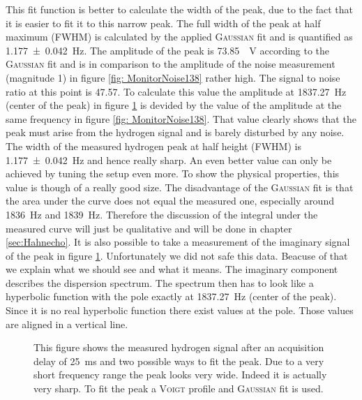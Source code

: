 This fit function is better to calculate the width of the peak, due to the fact that it is easier to fit it to this narrow peak.
The full width of the peak at half maximum (FWHM) is calculated by the applied \textsc{Gaussian} fit and is quantified as \SI{1.177 \pm 0.042}{\hertz}. \newline
The amplitude of the peak is \SI{73.85}{\mu \volt} according to the \textsc{Gaussian} fit and is in comparison to the amplitude of the noise measurement (magnitude \SI{1}{}) in figure \ref{fig: MonitorNoise138} rather high.
The signal to noise ratio at this point is \SI{47.57}{}.
To calculate this value the amplitude at \SI{1837.27}{\hertz} (center of the peak) in figure \ref{fig:Pulsandcollect138_delay_25_gauss} is devided by the value of the amplitude at the same frequency in figure \ref{fig: MonitorNoise138}.
That value clearly shows that the peak must arise from the hydrogen signal and is barely disturbed by any noise.\newline
The width of the measured hydrogen peak at half height (FWHM) is \SI{1.177 \pm 0.042}{\hertz} and hence really sharp.
An even better value can only be achieved by tuning the setup even more.
To show the physical properties, this value is though of a really good size.\newline
The disadvantage of the \textsc{Gaussian} fit is that the area under the curve does not equal the measured one, especially around \SI{1836}{\hertz} and \SI{1839}{\hertz}.
Therefore the discussion of the integral under the measured curve will just be qualitative and will be done in chapter \ref{sec:Hahnecho}.\newline
It is also possible to take a measurement of the imaginary signal of the peak in figure \ref{fig:Pulsandcollect138_delay_25_gauss}.
Unfortunately we did not safe this data.
Beacuse of that we explain what we should see and what it means.
The imaginary component describes the dispersion spectrum.
The spectrum then has to look like a hyperbolic function with the pole exactly at \SI{1837.27}{\hertz} (center of the peak).
Since it is no real hyperbolic function there exist values at the pole.
Those values are aligned in a vertical line.
\begin{figure}[H]
    \centering
    
    \caption[This figure shows the measured hydrogen signal after an acquisition delay of \SI{25}{\milli \second} and two possible ways to fit the peak.]{This figure shows the measured hydrogen signal after an acquisition delay of \SI{25}{\milli \second} and two possible ways to fit the peak.
    Due to a very short frequency range the peak looks very wide. Indeed it is actually very sharp.
    To fit the peak a \textsc{Voigt} profile and \textsc{Gaussian} fit is used.}
    \label{fig:Pulsandcollect138_delay_25_gauss}
\end{figure}